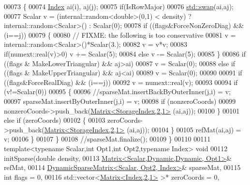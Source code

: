 \begin{DoxyCode}
00073     \{
00074       \hyperlink{namespace_eigen_a62e77e0933482dafde8fe197d9a2cfde}{Index} ai(i), aj(j);
00075       \textcolor{keywordflow}{if}(IsRowMajor)
00076         \hyperlink{endian_8c_a3ca5ecd34b04d6a243c054ac3a57f68d}{std::swap}(ai,aj);
00077       Scalar v = (internal::random<double>(0,1) < density) ? internal::random<Scalar>() : Scalar(0);
00078       \textcolor{keywordflow}{if} ((flags&ForceNonZeroDiag) && (i==j))
00079       \{
00080         \textcolor{comment}{// FIXME: the following is too conservative}
00081         v = internal::random<Scalar>()*Scalar(3.);
00082         v = v*v;
00083         \textcolor{keywordflow}{if}(numext::real(v)>0) v += Scalar(5);
00084         \textcolor{keywordflow}{else}                  v -= Scalar(5);
00085       \}
00086       \textcolor{keywordflow}{if} ((flags & MakeLowerTriangular) && aj>ai)
00087         v = Scalar(0);
00088       \textcolor{keywordflow}{else} \textcolor{keywordflow}{if} ((flags & MakeUpperTriangular) && aj<ai)
00089         v = Scalar(0);
00090 
00091       \textcolor{keywordflow}{if} ((flags&ForceRealDiag) && (i==j))
00092         v = numext::real(v);
00093 
00094       \textcolor{keywordflow}{if} (v!=Scalar(0))
00095       \{
00096         \textcolor{comment}{//sparseMat.insertBackByOuterInner(j,i) = v;}
00097         sparseMat.insertByOuterInner(j,i) = v;
00098         \textcolor{keywordflow}{if} (nonzeroCoords)
00099           nonzeroCoords->push\_back(\hyperlink{group___core___module_class_eigen_1_1_matrix}{Matrix<StorageIndex,2,1>} (ai,aj));
00100       \}
00101       \textcolor{keywordflow}{else} \textcolor{keywordflow}{if} (zeroCoords)
00102       \{
00103         zeroCoords->push\_back(\hyperlink{group___core___module_class_eigen_1_1_matrix}{Matrix<StorageIndex,2,1>} (ai,aj));
00104       \}
00105       refMat(ai,aj) = v;
00106     \}
00107   \}
00108   \textcolor{comment}{//sparseMat.finalize();}
00109 \}
00110 
00111 \textcolor{keyword}{template}<\textcolor{keyword}{typename} Scalar,\textcolor{keywordtype}{int} Opt1,\textcolor{keywordtype}{int} Opt2,\textcolor{keyword}{typename} Index> \textcolor{keywordtype}{void}
00112 initSparse(\textcolor{keywordtype}{double} density,
00113            \hyperlink{group___core___module_class_eigen_1_1_matrix}{Matrix<Scalar,Dynamic,Dynamic, Opt1>}& refMat,
00114            \hyperlink{class_eigen_1_1_dynamic_sparse_matrix}{DynamicSparseMatrix<Scalar, Opt2, Index>}& sparseMat,
00115            \textcolor{keywordtype}{int} flags = 0,
00116            std::vector<\hyperlink{group___core___module_class_eigen_1_1_matrix}{Matrix<Index,2,1>} >* zeroCoords = 0,

\end{DoxyCode}
